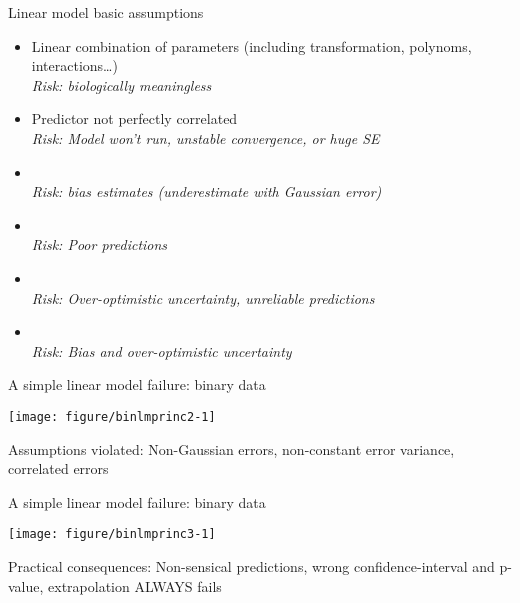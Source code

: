 \documentclass[10pt]{beamer}\usepackage[]{graphicx}\usepackage[]{color}
\newenvironment{knitrout}{}{} %
\begin{document}
\begin{frame}{Linear model basic assumptions}
 \begin{block}{}
     \begin{itemize}
      \item Linear combination of parameters (including transformation, polynoms, interactions\dots)\\ \textit{Risk: biologically meaningless}
      \item Predictor not perfectly correlated \\ \textit{Risk: Model won't run, unstable convergence, or huge SE}
       \item {\color{red!20!black}{Little error in predictors}}\\ \textit{Risk: bias estimates (underestimate with Gaussian error)}
       \item {\color{red!50!black}{Gaussian error distribution}}\\ \textit{Risk: Poor predictions}
       \item {\color{red!70!black}{Homoscedasticity (constant error variance)}}\\ \textit{Risk: Over-optimistic uncertainty, unreliable predictions}
       \item {\color{red!99!black}{Independence of error}}\\ \textit{Risk: Bias and over-optimistic uncertainty}
     \end{itemize}
 \end{block}
\end{frame}

\begin{frame}[fragile]{A simple linear model failure: binary data}

\begin{knitrout}\small
{}\color{fgcolor}
\texttt{[image: figure/binlmprinc2-1]} 

\end{knitrout}
  
  \begin{alertblock}{Assumptions violated:}
    Non-Gaussian errors, non-constant error variance, correlated errors
  \end{alertblock}
\end{frame}

\begin{frame}[fragile]{A simple linear model failure: binary data}

\begin{knitrout}\small
{}\color{fgcolor}
\texttt{[image: figure/binlmprinc3-1]} 

\end{knitrout}
  \begin{alertblock}{Practical consequences:}
    Non-sensical predictions, wrong confidence-interval and p-value, extrapolation ALWAYS fails
  \end{alertblock}
\end{frame}
\end{document}
